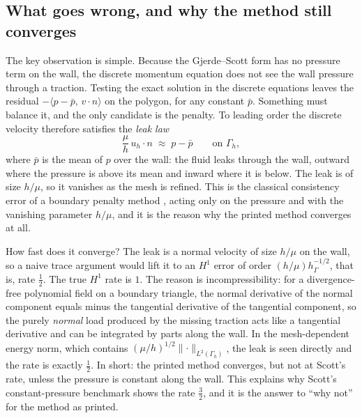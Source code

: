 \documentclass[pdflatex,sn-mathphys-num]{sn-jnl}
\theoremstyle{thmstyleone}
\theoremstyle{thmstylethree}
\newcommand{\hG}{h_\Gamma}
\newcommand{\Gh}{\Gamma_h}
\newcommand{\pbar}{\bar p}
\newcommand{\ip}[2]{\langle #1,\, #2\rangle}
\newcommand{\norm}[1]{\lVert #1\rVert}
\begin{document}
\subsection{What goes wrong, and why the method still converges}
The key observation is simple. Because the Gjerde--Scott form has no pressure term on the wall, the discrete momentum equation does not see the wall pressure through a traction. Testing the exact solution in the discrete equations leaves the residual $-\ip{p-\pbar}{v\cdot n}$ on the polygon, for any constant $\pbar$. Something must balance it, and the only candidate is the penalty. To leading order the discrete velocity therefore satisfies the \emph{leak law}
\[
\frac\mu h\,u_h\cdot n\;\approx\;p-\pbar\qquad\text{on }\Gh ,
\]
where $\pbar$ is the mean of $p$ over the wall: the fluid leaks through the wall, outward where the pressure is above its mean and inward where it is below. The leak is of size $h/\mu$, so it vanishes as the mesh is refined. This is the classical consistency error of a boundary penalty method \cite{Babuska1973}, acting only on the pressure and with the vanishing parameter $h/\mu$, and it is the reason why the printed method converges at all.

How fast does it converge? The leak is a normal velocity of size $h/\mu$ on the wall, so a naive trace argument would lift it to an $H^1$ error of order $(h/\mu)\hG^{-1/2}$, that is, rate $\frac12$. The true $H^1$ rate is $1$. The reason is incompressibility: for a divergence-free polynomial field on a boundary triangle, the normal derivative of the normal component equals minus the tangential derivative of the tangential component, so the purely \emph{normal} load produced by the missing traction acts like a tangential derivative and can be integrated by parts along the wall. In the mesh-dependent energy norm, which contains $(\mu/h)^{1/2}\norm{\cdot}_{L^2(\Gh)}$, the leak is seen directly and the rate is exactly $\frac12$. In short: the printed method converges, but not at Scott's rate, unless the pressure is constant along the wall. This explains why Scott's constant-pressure benchmark shows the rate $\frac32$, and it is the answer to ``why not'' for the method as printed.
\end{document}
